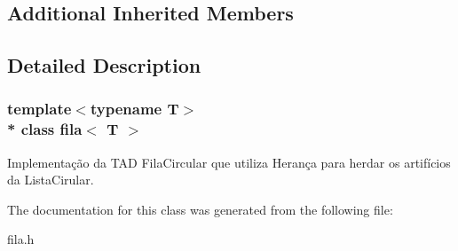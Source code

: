 \subsection*{Additional Inherited Members}


\subsection{Detailed Description}
\subsubsection*{template$<$typename T$>$\\*
class fila$<$ T $>$}

Implementação da T\+AD Fila\+Circular que utiliza Herança para herdar os artifícios da Lista\+Cirular. 

The documentation for this class was generated from the following file\+:\begin{DoxyCompactItemize}
\item 
fila.\+h\end{DoxyCompactItemize}
